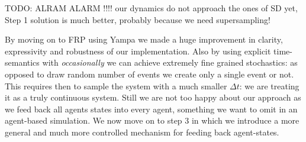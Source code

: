 TODO: ALRAM ALARM !!!! our dynamics do not approach the ones of SD yet, Step 1 solution is much better, probably because we need supersampling!

By moving on to FRP using Yampa we made a huge improvement in clarity, expressivity and robustness of our implementation. Also by using explicit time-semantics with \textit{occasionally} we can achieve extremely fine grained stochastics: as opposed to draw random number of events we create only a single event or not. This requires then to sample the system with a much smaller $\Delta t$: we are treating it as a truly continuous system.
Still we are not too happy about our approach as we feed back all agents states into every agent, something we want to omit in an agent-based simulation. We now move on to step 3 in which we introduce a more general and much more controlled mechanism for feeding back agent-states. 